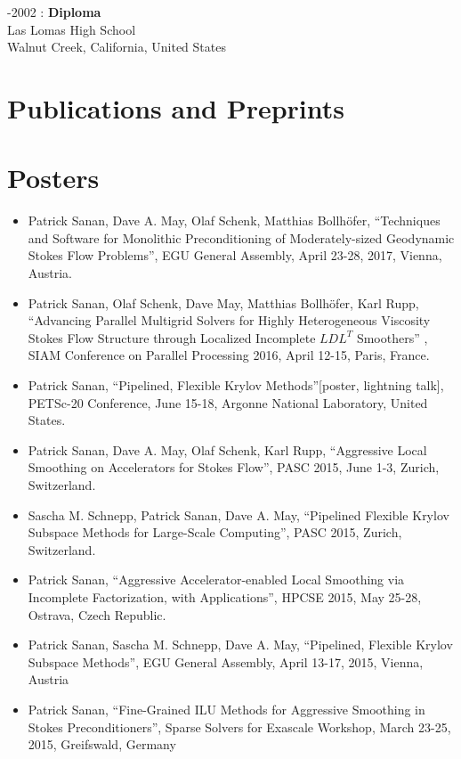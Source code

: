-2002 : \textbf{Diploma}\\
Las Lomas High School\\
Walnut Creek, California, United States\\

\section*{Publications and Preprints}


\section*{Posters}
\begin{itemize}
\item Patrick Sanan, Dave A. May, Olaf Schenk, Matthias Bollh\"{o}fer, ``Techniques and Software for Monolithic Preconditioning of Moderately-sized Geodynamic Stokes Flow Problems'', EGU General Assembly, April 23-28, 2017, Vienna, Austria.
\item Patrick Sanan, Olaf Schenk, Dave May, Matthias Bollh\"{o}fer, Karl Rupp, ``Advancing Parallel Multigrid Solvers for Highly Heterogeneous Viscosity Stokes Flow Structure through Localized Incomplete $LDL^T$ Smoothers'' , SIAM Conference on Parallel Processing 2016, April 12-15, Paris, France.
\item Patrick Sanan, ``Pipelined, Flexible Krylov Methods''[poster, lightning talk], PETSc-20 Conference, June 15-18, Argonne National Laboratory, United States.
\item Patrick Sanan, Dave A. May, Olaf Schenk, Karl Rupp, ``Aggressive Local Smoothing on Accelerators for Stokes Flow'', PASC 2015, June 1-3, Zurich, Switzerland.
\item Sascha M. Schnepp, Patrick Sanan, Dave A. May, ``Pipelined Flexible Krylov Subspace Methods for Large-Scale Computing'', PASC 2015, Zurich, Switzerland.
\item Patrick Sanan, ``Aggressive Accelerator-enabled Local Smoothing via Incomplete Factorization, with Applications'', HPCSE 2015, May 25-28, Ostrava, Czech Republic.
\item Patrick Sanan, Sascha M. Schnepp, Dave A. May, ``Pipelined, Flexible Krylov Subspace Methods'', EGU General Assembly, April 13-17, 2015, Vienna, Austria
\item Patrick Sanan, ``Fine-Grained ILU Methods for Aggressive Smoothing in Stokes Preconditioners'', Sparse Solvers for Exascale Workshop, March 23-25, 2015, Greifswald, Germany

\end{itemize}
